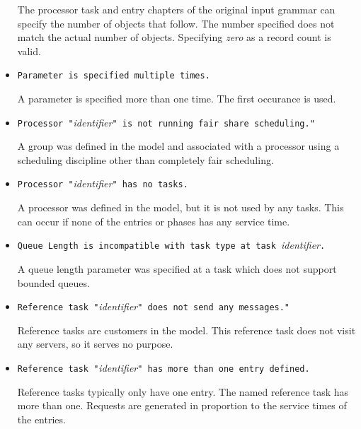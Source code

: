 \begin{itemize}
  The processor task and entry chapters of the original input
  grammar can specify the number of objects
  that follow.  The number specified does not match the actual number
  of objects.  Specifying \emph{zero} as a record count is valid.

\item \texttt{Parameter is specified multiple times.}

  A parameter is specified more than one time.  The first occurance is
  used.

\item \texttt{Processor "}\emph{identifier}\texttt{" is not running fair share scheduling." }
  
  A group was defined in the model and associated
  with a processor using a scheduling discipline other than completely fair scheduling.

\item \texttt{Processor "}\emph{identifier}\texttt{" has no tasks.}
  
  A processor was defined in the model, but it is not used by any
  tasks.  This can occur if none of the
  entries or phases has any service time.

\item \texttt{Queue Length is incompatible with task type at task
  }\emph{identifier}\texttt{.}
  
  A queue length parameter was specified at a
  task which does not support bounded queues.

\item \texttt{Reference task "}\emph{identifier}\texttt{" does not
    send any messages." }
  
  Reference tasks are customers in the
  model.  This reference task does not visit any servers, so it serves
  no purpose.

\item \texttt{Reference task "}\emph{identifier}\texttt{" has more
    than one entry defined.}
  
  Reference tasks
  typically only have one entry.  The named reference task has more
  than one.  Requests are generated in proportion to the service times
  of the entries.


\end{itemize}
